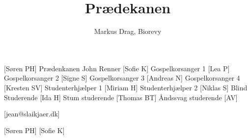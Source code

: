 \documentclass[a4paper,12pt]{article}
\title{Prædekanen}
\author{Markus Drag, Biorevy}
\begin{document}
\maketitle



\begin{roles}
	[Søren PH] Prædenkanen John Renner
	[Sofie K] Gospelkorsanger 1
	[Lea P] Gospelkorsanger 2
	[Signe S] Gospelkorsanger 3
	[Andreas N] Gospelkorsanger 4
	[Kresten SV] Studenterhjælper 1
	[Miriam H] Studenterhjælper 2	
	[Niklas S] Blind Studerende	
	[Ida H] Stum studerende
	[Thomas BT] Åndssvag studerende
	[AV]
\end{roles}

\begin{texxers}
	[jean@slaikjaer.dk]
\end{texxers}

\begin{props}
	[Søren PH]
	[Sofie K]
\end{props}
\end{document}
